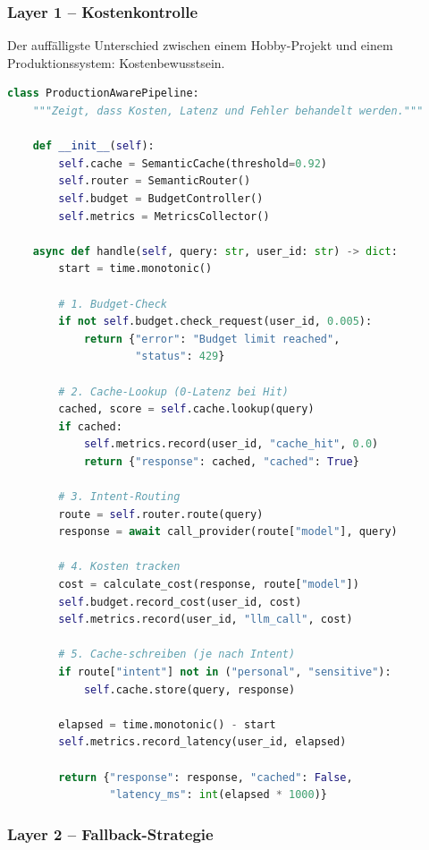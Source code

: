 \subsubsection{Layer 1 -- Kostenkontrolle}

Der auffälligste Unterschied zwischen einem Hobby-Projekt und einem Produktionssystem: Kostenbewusstsein.

\begin{lstlisting}[language=Python, caption=Cost-Awareness im Portfolio nachweisen]
class ProductionAwarePipeline:
    """Zeigt, dass Kosten, Latenz und Fehler behandelt werden."""

    def __init__(self):
        self.cache = SemanticCache(threshold=0.92)
        self.router = SemanticRouter()
        self.budget = BudgetController()
        self.metrics = MetricsCollector()

    async def handle(self, query: str, user_id: str) -> dict:
        start = time.monotonic()

        # 1. Budget-Check
        if not self.budget.check_request(user_id, 0.005):
            return {"error": "Budget limit reached",
                    "status": 429}

        # 2. Cache-Lookup (0-Latenz bei Hit)
        cached, score = self.cache.lookup(query)
        if cached:
            self.metrics.record(user_id, "cache_hit", 0.0)
            return {"response": cached, "cached": True}

        # 3. Intent-Routing
        route = self.router.route(query)
        response = await call_provider(route["model"], query)

        # 4. Kosten tracken
        cost = calculate_cost(response, route["model"])
        self.budget.record_cost(user_id, cost)
        self.metrics.record(user_id, "llm_call", cost)

        # 5. Cache-schreiben (je nach Intent)
        if route["intent"] not in ("personal", "sensitive"):
            self.cache.store(query, response)

        elapsed = time.monotonic() - start
        self.metrics.record_latency(user_id, elapsed)

        return {"response": response, "cached": False,
                "latency_ms": int(elapsed * 1000)}
\end{lstlisting}

\subsubsection{Layer 2 -- Fallback-Strategie}

